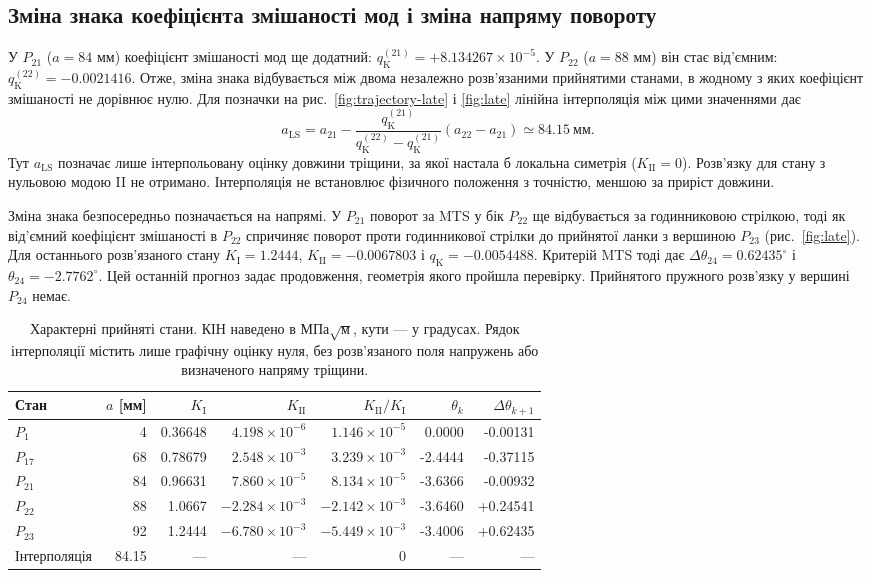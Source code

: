 \documentclass[a4paper,12pt]{article}
\newcommand{\qmix}{q_{\mathrm{K}}}
\newcommand{\LSLengthMM}{84.15}
\newcommand{\CharacteristicRows}{$P_{1}$ & 4 & 0.36648 & $4.198\times10^{-6}$ & $1.146\times10^{-5}$ & 0.0000 & -0.00131 \\
$P_{17}$ & 68 & 0.78679 & $2.548\times10^{-3}$ & $3.239\times10^{-3}$ & -2.4444 & -0.37115 \\
$P_{21}$ & 84 & 0.96631 & $7.860\times10^{-5}$ & $8.134\times10^{-5}$ & -3.6366 & -0.00932 \\
$P_{22}$ & 88 & 1.0667 & $-2.284\times10^{-3}$ & $-2.142\times10^{-3}$ & -3.6460 & +0.24541 \\
$P_{23}$ & 92 & 1.2444 & $-6.780\times10^{-3}$ & $-5.449\times10^{-3}$ & -3.4006 & +0.62435 \\}
\begin{document}
\subsection{Зміна знака коефіцієнта змішаності мод і зміна напряму повороту}
У $P_{21}$ ($a=84$ мм) коефіцієнт змішаності мод ще додатний:
$q_{\mathrm{K}}^{(21)}=+8.134267\times10^{-5}$. У $P_{22}$ ($a=88$ мм) він стає від’ємним:
$q_{\mathrm{K}}^{(22)}=-0.0021416$. Отже, зміна знака відбувається між двома незалежно розв’язаними прийнятими станами,
в жодному з яких коефіцієнт змішаності не дорівнює нулю. Для позначки на рис.~\ref{fig:trajectory-late} і \ref{fig:late} лінійна
інтерполяція між цими значеннями дає
\begin{equation}
 a_{\mathrm{LS}}=a_{21}
 -\frac{\qmix^{(21)}}{\qmix^{(22)}-\qmix^{(21)}}(a_{22}-a_{21})
 \simeq\LSLengthMM\ \text{мм}.\label{eq:zeroestimate}
\end{equation}
Тут $a_{\mathrm{LS}}$ позначає лише інтерпольовану оцінку довжини тріщини, за якої настала б локальна симетрія
($K_{\mathrm{II}}=0$). Розв’язку для стану з нульовою модою II не отримано. Інтерполяція не встановлює фізичного
положення з точністю, меншою за приріст довжини.

Зміна знака безпосередньо позначається на напрямі. У $P_{21}$ поворот за MTS у бік $P_{22}$ ще відбувається
за годинниковою стрілкою, тоді як від’ємний коефіцієнт змішаності в $P_{22}$ спричиняє поворот проти
годинникової стрілки до прийнятої ланки з вершиною $P_{23}$ (рис.~\ref{fig:late}). Для останнього
розв’язаного стану $K_{\mathrm{I}}=1.2444$, $K_{\mathrm{II}}=-0.0067803$ і $q_{\mathrm{K}}=-0.0054488$. Критерій MTS тоді дає $\Delta\theta_{24}=0.62435^\circ$ і $\theta_{24}=-2.7762^\circ$. Цей останній прогноз задає
продовження, геометрія якого пройшла перевірку. Прийнятого пружного розв’язку у вершині $P_{24}$
немає.

\begin{table}[htbp]\centering\small\setlength{\tabcolsep}{3.5pt}
\caption{Характерні прийняті стани. КІН наведено в МПа$\sqrt{\text{м}}$, кути — у градусах. Рядок інтерполяції містить
лише графічну оцінку нуля, без розв’язаного поля напружень або визначеного напряму тріщини.}
\begin{tabular}{lrrrrrr}\toprule
Стан & $a$ [мм] & $K_{\mathrm{I}}$ & $K_{\mathrm{II}}$ & $K_{\mathrm{II}}/K_{\mathrm{I}}$ & $\theta_k$ & $\Delta\theta_{k+1}$\\\midrule
\CharacteristicRows
Інтерполяція & \LSLengthMM & --- & --- & $0$ & --- & ---\\
\bottomrule\end{tabular}\label{tab:states}
\end{table}
\end{document}
